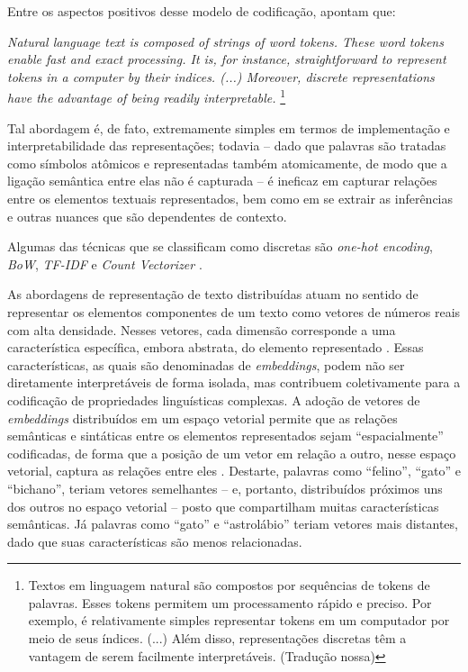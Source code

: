 Entre os aspectos positivos desse modelo de codificação,  apontam que:
\begin{citacao}
    \textit{Natural language text is composed of strings of word tokens. These word tokens enable fast and exact processing. It is, for instance, straightforward to represent tokens in a computer by their indices. (...) Moreover, discrete representations have the advantage of being readily interpretable.} \footnote{Textos em linguagem natural são compostos por sequências de tokens de palavras. Esses tokens permitem um processamento rápido e preciso. Por exemplo, é relativamente simples representar tokens em um computador por meio de seus índices. (...) Além disso, representações discretas têm a vantagem de serem facilmente interpretáveis. (Tradução nossa)}
\end{citacao}


Tal abordagem é, de fato, extremamente simples em termos de implementação e interpretabilidade das representações; todavia -- dado que palavras são tratadas como símbolos atômicos e representadas também atomicamente, de modo que a ligação semântica entre elas não é capturada -- é ineficaz em capturar relações entre os elementos textuais representados, bem como em se extrair as inferências e outras nuances que são dependentes de contexto.

Algumas das técnicas que se classificam como discretas são \textit{one-hot encoding}, \textit{\ac{BoW}}, \textit{\ac{TF-IDF}} e \textit{Count Vectorizer} \cite{Representacao-Texto:2, Representacao-Texto:3}.

As abordagens de representação de texto distribuídas atuam no sentido de representar os elementos componentes de um texto como vetores de números reais com alta densidade. Nesses vetores, cada dimensão corresponde a uma característica específica, embora abstrata, do elemento representado \cite{Representacao-Distribuida:1}. Essas características, as quais são denominadas de \textit{embeddings}, podem não ser diretamente interpretáveis de forma isolada, mas contribuem coletivamente para a codificação de propriedades linguísticas complexas. A adoção de vetores de \textit{embeddings} distribuídos em um espaço vetorial permite que as relações semânticas e sintáticas entre os elementos representados sejam ``espacialmente'' codificadas, de forma que a posição de um vetor em relação a outro, nesse espaço vetorial, captura as relações entre eles \cite{Representacao-Distribuida:2}. Destarte, palavras como ``felino'', ``gato'' e ``bichano'', teriam vetores semelhantes -- e, portanto, distribuídos próximos uns dos outros no espaço vetorial -- posto que compartilham muitas características semânticas. Já palavras como ``gato'' e ``astrolábio'' teriam vetores mais distantes, dado que suas características são menos relacionadas.

